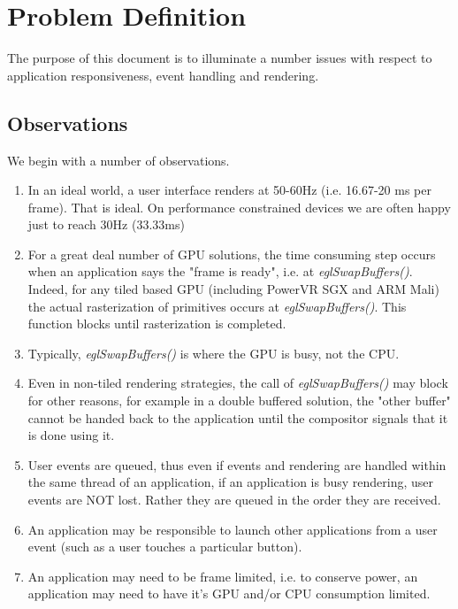 \documentclass[a4paper,11pt]{article}
\begin{document}
\newpage

\renewcommand{\contentsname}{Table of Contents}
{
\singlespacing
\tableofcontents
}

\setlength{\parindent}{0pt}

\newpage

\section{Problem Definition}
\begin{indenter}{2cm}

The purpose of this document is to illuminate a number issues with
respect to application responsiveness, event handling and rendering.

\end{indenter}
\subsection{Observations}
\begin{indenter}{2cm}

We begin with a number of observations.
\begin{enumerate}
\item In an ideal world, a user interface renders at 50-60Hz 
(i.e. 16.67-20 ms per frame). That is ideal. On performance
constrained devices we are often happy just to reach 30Hz
(33.33ms)
\item For a great deal number of GPU solutions, the time consuming step
occurs when an application says the "frame is ready", i.e. at \textit{eglSwapBuffers()}.
Indeed, for any tiled based GPU (including PowerVR SGX and ARM Mali) the
actual rasterization of primitives occurs at  \textit{eglSwapBuffers()}. This function
blocks until rasterization is completed.
\item Typically,  \textit{eglSwapBuffers()} is where the GPU is busy, not the CPU.
\item Even in non-tiled rendering strategies, the call of  \textit{eglSwapBuffers()}
may block for other reasons, for example in a double buffered solution,
the "other buffer" cannot be handed back to the application until the 
compositor signals that it is done using it.
\item User events are queued, thus even if events and rendering are handled
within the same thread of an application, if an application is busy rendering, 
user events are NOT lost. Rather they are queued in the order they are
received.
\item An application may be responsible to launch other applications from
a user event (such as a user touches a particular button).
\item An application may need to be frame limited, i.e. to conserve power,
an application may need to have it's GPU and/or CPU consumption limited.
\end{enumerate}

\end{indenter}
\end{document}
